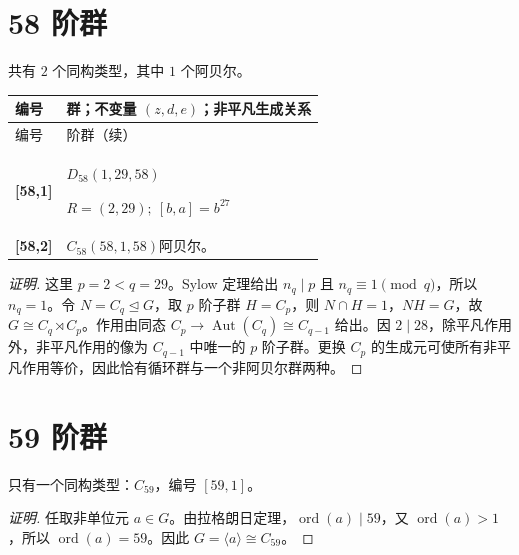 \documentclass[UTF8,fontset=fandol,11pt,a4paper]{ctexart}
\newcommand{\Aut}{\operatorname{Aut}}\newcommand{\GL}{\operatorname{GL}}\newcommand{\ord}{\operatorname{ord}}\newcommand{\Z}{\mathrm Z}
\begin{document}
\section*{58 阶群}\label{order:58}

共有 $2$ 个同构类型，其中 $1$ 个阿贝尔。

\begingroup\small\setlength{\tabcolsep}{3pt}\renewcommand{\arraystretch}{1.12}

\begin{longtable}{@{}p{17mm}>{\raggedright\arraybackslash}p{141mm}@{}}

\toprule 编号 & 群；不变量 $(z,d,e)$；非平凡生成关系\\\midrule\endfirsthead

\toprule 编号 & 58 阶群（续）\\\midrule\endhead\bottomrule\endfoot

\textbf{[58,1]} & $D_{58}$\quad $(1,29,58)$\par\(R=(2,29);\allowbreak\ [b,a]=b^{27}\)\\[3pt]

\textbf{[58,2]} & $C_{58}$\quad $(58,1,58)$\quad 阿贝尔。\\[3pt]

\end{longtable}\endgroup

\begin{proof}[证明]
这里 $p=2<q=29$。Sylow 定理给出 $n_q\mid p$ 且 $n_q\equiv1\pmod q$，所以 $n_q=1$。令 $N=C_q\trianglelefteq G$，取 $p$ 阶子群 $H=C_p$，则 $N\cap H=1$，$NH=G$，故 $G\cong C_q\rtimes C_p$。作用由同态 $C_p\to\Aut(C_q)\cong C_{q-1}$ 给出。因 $2\mid 28$，除平凡作用外，非平凡作用的像为 $C_{q-1}$ 中唯一的 $p$ 阶子群。更换 $C_p$ 的生成元可使所有非平凡作用等价，因此恰有循环群与一个非阿贝尔群两种。
\end{proof}

\section*{59 阶群}\label{order:59}

只有一个同构类型：$C_{59}$，编号 $[59,1]$。

\begin{proof}[证明]
任取非单位元 $a\in G$。由拉格朗日定理，$\ord(a)\mid 59$，又 $\ord(a)>1$，所以 $\ord(a)=59$。因此 $G=\langle a\rangle\cong C_{59}$。
\end{proof}
\end{document}
